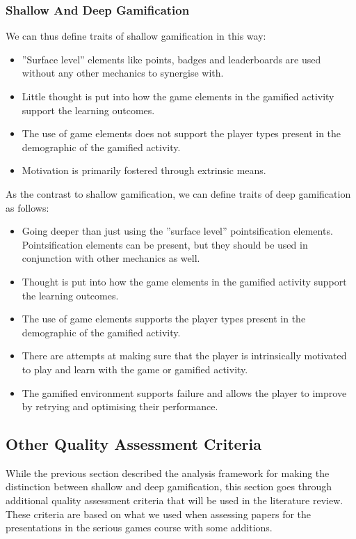 \subsubsection{Shallow And Deep Gamification}
We can thus define traits of shallow gamification in this way:
\begin{itemize}
    \item ''Surface level'' elements like points, badges and leaderboards are used without any other mechanics to synergise with.
    \item Little thought is put into how the game elements in the gamified activity support the learning outcomes. 
    \item The use of game elements does not support the player types present in the demographic of the gamified activity.
    \item Motivation is primarily fostered through extrinsic means. 
\end{itemize}

As the contrast to shallow gamification, we can define traits of deep gamification as follows:
\begin{itemize}
    \item Going deeper than just using the ''surface level'' pointsification elements. Pointsification elements can be present, but they should be used in conjunction with other mechanics as well. 
    \item Thought is put into how the game elements in the gamified activity support the learning outcomes.
    \item The use of game elements supports the player types present in the demographic of the gamified activity.
    \item There are attempts at making sure that the player is intrinsically motivated to play and learn with the game or gamified activity. 
    \item The gamified environment supports failure and allows the player to improve by retrying and optimising their performance. 
\end{itemize}


\subsection{Other Quality Assessment Criteria}
While the previous section described the analysis framework for making the distinction between shallow and deep gamification, this section goes through additional quality assessment criteria that will be used in the literature review. These criteria are based on what we used when assessing papers for the presentations in the serious games course with some additions. 

